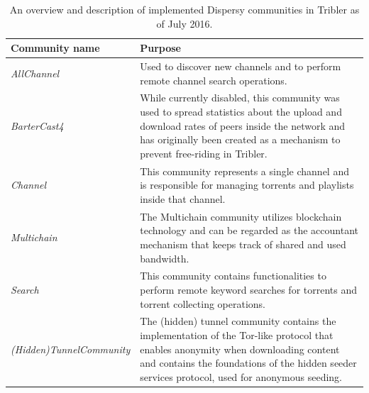 \begin{table}
	\begin{tabularx}{\textwidth}{|l|X|}
		\hline
		\textbf{Community name} & \textbf{Purpose} \\ \hline
		\emph{AllChannel} & Used to discover new channels and to perform remote channel search operations.\\ \hline
		\emph{BarterCast4} & While currently disabled, this community was used to spread statistics about the upload and download rates of peers inside the network and has originally been created as a mechanism to prevent free-riding in Tribler\cite{meulpolder2009bartercast}.\\ \hline
		\emph{Channel} & This community represents a single channel and is responsible for managing torrents and playlists inside that channel.\\ \hline
		\emph{Multichain} & The Multichain community utilizes blockchain technology and can be regarded as the accountant mechanism that keeps track of shared and used bandwidth.\\ \hline
		\emph{Search} & This community contains functionalities to perform remote keyword searches for torrents and torrent collecting operations.\\ \hline
		\emph{(Hidden)TunnelCommunity} & The (hidden) tunnel community contains the implementation of the Tor-like protocol that enables anonymity when downloading content and contains the foundations of the hidden seeder services protocol, used for anonymous seeding.\\ \hline
	\end{tabularx}
	\caption{An overview and description of implemented Dispersy communities in Tribler as of July 2016.}
	\label{table:dispersy-communities}
\end{table}

